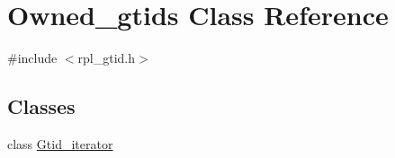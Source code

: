 \hypertarget{classOwned__gtids}{}\section{Owned\+\_\+gtids Class Reference}
\label{classOwned__gtids}


{\ttfamily \#include $<$rpl\+\_\+gtid.\+h$>$}

\subsection*{Classes}
\begin{DoxyCompactItemize}
\item 
class \mbox{\hyperlink{classOwned__gtids_1_1Gtid__iterator}{Gtid\+\_\+iterator}}
\end{DoxyCompactItemize}
